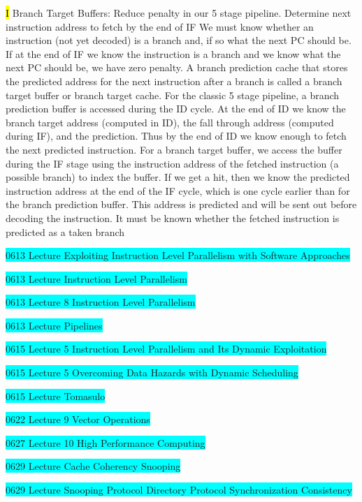 \documentclass[fontsize=4pt]{scrartcl}
\begin{document}
\hl{I}
Branch Target Buffers: Reduce penalty in our 5 stage pipeline. Determine next instruction address to fetch by the end of IF 
We must know whether an instruction (not yet decoded) is a branch and, if so what the next PC should be. If at the end of IF we know the instruction is a branch and we know what the next PC should be, we have zero penalty. A branch prediction cache that stores the predicted address for the next instruction after a branch is called a branch target buffer or branch target cache. For the classic 5 stage pipeline, a branch prediction buffer is accessed during the ID cycle.  At the end of ID we know the branch target address (computed in ID), the fall through address (computed during IF), and the prediction. Thus by the end of ID we know enough to fetch the next predicted instruction. For a branch target buffer, we access the buffer during the IF stage using the instruction address of the fetched instruction (a possible branch) to index the buffer. If we get a hit, then we know the predicted instruction address at the end of the IF cycle, which is one cycle earlier than for the branch prediction buffer. This address is predicted and will be sent out before decoding the instruction.  It must be known whether the fetched instruction is predicted as a taken branch





\colorbox{Cyan}{0613 Lecture Exploiting Instruction Level Parallelism with Software Approaches}

\colorbox{Cyan}{0613 Lecture Instruction Level Parallelism}

\colorbox{Cyan}{0613 Lecture 8 Instruction Level Parallelism}

\colorbox{Cyan}{0613 Lecture Pipelines}

\colorbox{Cyan}{0615 Lecture 5 Instruction Level Parallelism and Its Dynamic Exploitation}

\colorbox{Cyan}{0615 Lecture 5 Overcoming Data Hazards with Dynamic Scheduling}

\colorbox{Cyan}{0615 Lecture Tomasulo}

\colorbox{Cyan}{0622 Lecture 9 Vector Operations}

\colorbox{Cyan}{0627 Lecture 10 High Performance Computing}

\colorbox{Cyan}{0629 Lecture Cache Coherency Snooping}

\colorbox{Cyan}{0629 Lecture Snooping Protocol Directory Protocol Synchronization Consistency}
\end{document}
